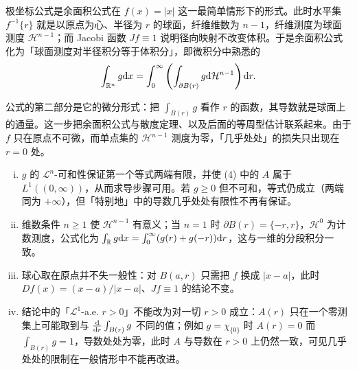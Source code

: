 \documentclass[../../main.tex]{subfiles}%
\begin{document}
\begin{remark}\label{remark:ch03-thm-3-12-动机}
极坐标公式是余面积公式在 $f(x)=\lvert x\rvert$ 这一最简单情形下的形式。此时水平集 $f^{-1}\{r\}$ 就是以原点为心、半径为 $r$ 的球面，纤维维数为 $n-1$，纤维测度为球面测度 $\mathcal{H}^{n-1}$；而 Jacobi 函数 $Jf\equiv1$ 说明径向映射不改变体积。于是余面积公式化为「球面测度对半径积分等于体积分」，即微积分中熟悉的
\begin{align*}
\int_{\mathbb{R}^n}g\mathrm{d} x=\int_0^{\infty}\left(\int_{\partial B(r)}g\mathrm{d}\mathcal{H}^{n-1}\right)\mathrm{d} r.
\end{align*}

公式的第二部分是它的微分形式：把 $\int_{B(r)}g$ 看作 $r$ 的函数，其导数就是球面上的通量。这一步把余面积公式与散度定理、以及后面的等周型估计联系起来。由于 $f$ 只在原点不可微，而单点集的 $\mathcal{H}^{n-1}$ 测度为零，「几乎处处」的损失只出现在 $r=0$ 处。
\end{remark}

\begin{remark}\label{remark:ch03-thm-3-12-条件}
\begin{enumerate}[(i)]
\item $g$ 的 $\mathcal{L}^n$-可和性保证第一个等式两端有限，并使 (4) 中的 $A$ 属于 $L^1((0,\infty))$，从而求导步骤可用。若 $g\geqslant0$ 但不可和，等式仍成立（两端同为 $+\infty$），但「特别地」中的导数几乎处处有限性不再有保证。
\item 维数条件 $n\geqslant1$ 使 $\mathcal{H}^{n-1}$ 有意义；当 $n=1$ 时 $\partial B(r)=\{-r,r\}$，$\mathcal{H}^0$ 为计数测度，公式化为 $\int_{\mathbb{R}}g\mathrm{d} x=\int_0^{\infty}(g(r)+g(-r))\mathrm{d} r$，这与一维的分段积分一致。
\item 球心取在原点并不失一般性：对 $B(a,r)$ 只需把 $f$ 换成 $\lvert x-a\rvert$，此时 $Df(x)=(x-a)/\lvert x-a\rvert$、$Jf\equiv1$ 的结论不变。
\item 结论中的「$\mathcal{L}^1$-a.e. $r>0$」不能改为对一切 $r>0$ 成立：$A(r)$ 只在一个零测集上可能取到与 $\frac{\mathrm{d}}{\mathrm{d} r}\int_{B(r)}g$ 不同的值；例如 $g=\chi_{\{0\}}$ 时 $A(r)=0$ 而 $\int_{B(r)}g=1$，导数处处为零，此时 $A$ 与导数在 $r>0$ 上仍然一致，可见几乎处处的限制在一般情形中不能再改进。
\end{enumerate}
\end{remark}
\end{document}
